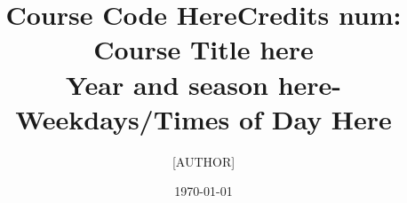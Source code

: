 


\newcommand{\myAuthor}              {[AUTHOR]} %
\newcommand{\mySubject}             {PDF Subject Here}  %
\newcommand{\myKeywords}            {PDF Keywords Here} %
\newcommand{\myCourseDateCreated}   {Created Date Here}
\newcommand{\myCourseDateUpdated}   {\today}
\newcommand{\myCourseCredits}       {Credits num}
\newcommand{\myCourseCode}          {Course Code Here}
\newcommand{\myCourseTitle}         {Course Title here}
\newcommand{\myCourseProf}          {Course Prof Here}    %
\newcommand{\myCourseSemester}      {Year and season here} %
\newcommand{\myCourseSchedule}      {Weekdays/Times of Day Here} %
\newcommand{\myCourseSection}       {Section Here} %
\newcommand{\myCourseLocation}      {Course Location}
\newcommand{\myTitle}{\myCourseCode \myCourseCredits: \myCourseTitle \\ \myCourseSemester - \myCourseSchedule}

\newcommand{\comment}[1]{}                          %
\newcommand{\image}[1]{[\textbf{IMAGE MISSING #1}]} %
\newenvironment{itemize*}{\begin{itemize}\setlength{\itemsep}{0pt}\setlength{\parskip}{0pt}}{\end{itemize}}
\newenvironment{enumerate*}{\begin{enumerate}\setlength{\itemsep}{0pt}\setlength{\parskip}{0pt}}{\end{enumerate}}

\documentclass{article}
\title{\myTitle}
\author{\myAuthor}
\date{\myCourseDateUpdated}

\usepackage{hyperref}   %
\usepackage{listings}   %
\usepackage{graphicx}   %

